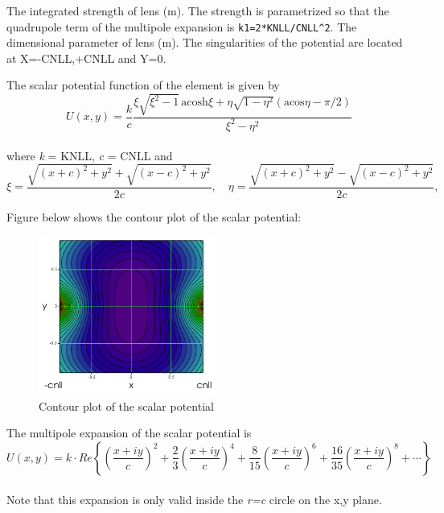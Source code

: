 \begin{madlist}
    The integrated strength of lens (m). The strength is
     parametrized so that the quadrupole term of the multipole
     expansion is {\tt k1=2*KNLL/CNLL\textasciicircum2}.      
    The dimensional parameter of lens (m). The singularities
     of the potential are located at X=-CNLL,+CNLL and Y=0.  
\end{madlist}

The scalar potential function of the element is given by
\begin{equation}
U(x,y)=\frac{k}{c}\frac{\xi\sqrt{\xi^2-1} \, \text{acosh}\xi +  
  \eta\sqrt{1-\eta^2}(\text{acos}\eta-\pi/2)}{\xi^2-\eta^2}
\end{equation}
\\ where \textit{k} = KNLL, \textit{c} = CNLL and 
\begin{equation}
\xi = \frac{\sqrt{(x+c)^2+y^2}+\sqrt{(x-c)^2+y^2}}{2c}, 
\quad \eta = \frac{\sqrt{(x+c)^2+y^2}-\sqrt{(x-c)^2+y^2}}{2c},
\end{equation}

Figure below shows the contour plot of the scalar potential: \\
\begin{figure}
  \begin{center}    
    \includegraphics[width=220px]{jpg/nllens_potential-2D.jpg}
    \caption{Contour plot of the scalar potential}
    \label{fig:nllens_potential}
  \end{center}
\end{figure}

The multipole expansion of the scalar potential is \\
\begin{equation}
U(x,y)=k\cdot Re\left\{ \left(\dfrac{x + i y}{c}\right)^2 + 
\frac{2}{3}\left(\dfrac{x + i y}{c}\right)^4 +
\frac{8}{15}\left(\dfrac{x + i y}{c}\right)^6 + 
\frac{16}{35}\left(\dfrac{x + i y}{c}\right)^8 + \cdots \right\}
\end{equation}
\\ 
Note that this expansion is only valid inside the \textit{r=c} circle on
the x,y plane.    

